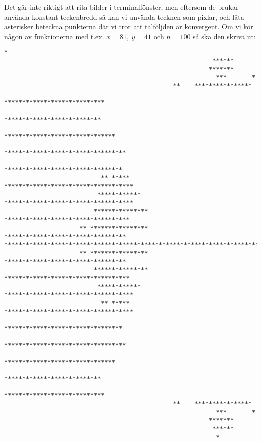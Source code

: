 \documentclass[10pt, twoside,a4paper]{article}
\begin{document}
Det går inte riktigt att rita bilder i terminalfönster, men eftersom de brukar använda konstant teckenbredd så kan vi använda tecknen som pixlar, och låta asterisker beteckna punkterna där vi tror att talföljden är konvergent. Om vi kör någon av funktionerna med t.ex. $x= 81$, $y = 41$ och $n = 100$ så ska den skriva ut:
\begin{lstlisting}[keepspaces=true]
                                                           *                     
                                                          ******                 
                                                         *******                 
                                                           ***       *           
                                               **    ****************            
                                               ****************************      
                                              ***************************        
                                            *******************************      
                                           **********************************    
                                           *********************************     
                           ** *****      ************************************    
                          ************   ************************************    
                         *************** ***********************************     
                     ** **************** **********************************      
*************************************************************************        
                     ** **************** **********************************      
                         *************** ***********************************     
                          ************   ************************************    
                           ** *****      ************************************    
                                           *********************************     
                                           **********************************    
                                            *******************************      
                                              ***************************        
                                               ****************************      
                                               **    ****************            
                                                           ***       *           
                                                         *******                 
                                                          ******                 
                                                           *  
\end{lstlisting}
\end{document}
